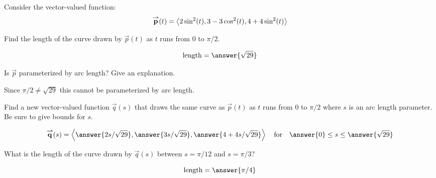 \documentclass{ximera}
\author{Bart Snapp}
\begin{document}
Consider the vector-valued function:
\[
{\overset{\boldsymbol{\rightharpoonup}}{\mathbf{p}}}(t) = \left\langle 2\sin^2(t),3-3\cos^2(t),4+4\sin^2(t)\right\rangle
\]

\begin{problem}
  Find the length of the curve drawn by $\vec{p}(t)$ as $t$ runs from
  $0$ to $\pi/2$.
  \begin{prompt}
    \[
    \text{length} = \answer{\sqrt{29}}
    \]
  \end{prompt}

  \vfill
  
\end{problem}

\begin{problem}
  Is $\vec{p}$ parameterized by arc length? Give an explanation.
  \begin{prompt}
    \begin{multipleChoice}
    \end{multipleChoice}
    \begin{feedback}
      Since $\pi/2 \ne \sqrt{29}$ this cannot be parameterized by arc
      length.
    \end{feedback}
  \end{prompt}

  \vfill
  
\end{problem}

\begin{problem}
  Find a new vector-valued function $\vec{q}(s)$ that draws the same
  curve as $\vec{p}(t)$ as $t$ runs from $0$ to $\pi/2$ where $s$ is
  an arc length parameter. Be sure to give bounds for $s$.
  \begin{prompt}
    \[
    \vec{q}(s) = \vector{\answer{2s/\sqrt{29}},\answer{3s/\sqrt{29}},\answer{4+4s/\sqrt{29}}}\quad\text{for}\quad\answer{0}\le s \le \answer{\sqrt{29}} 
    \]
  \end{prompt}

  \vfill
  
\end{problem}

\begin{problem}
  What is the length of the curve drawn by $\vec{q}(s)$ between
  $s=\pi/12$ and $s=\pi/3$?
  \begin{prompt}
    \[
    \text{length}=\answer{\pi/4}
    \]
  \end{prompt}
\end{problem}
\end{document}
